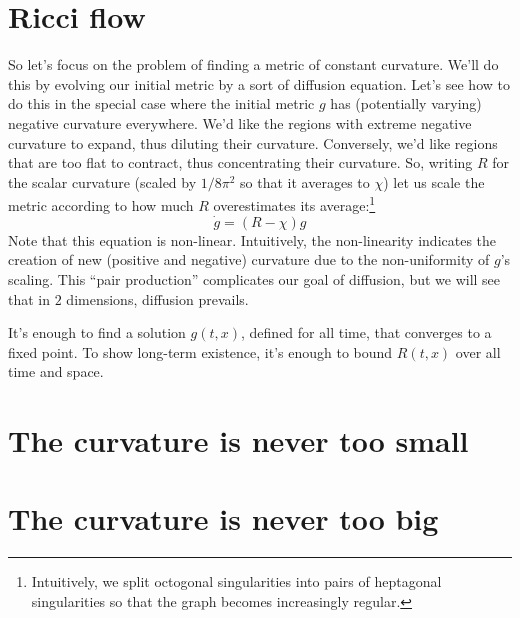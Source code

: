 \documentclass[11pt, justified]{tufte-book}
\theoremstyle{definition}
\newcommand{\msec}[1]{\section{\color{mblu}\textsf{#1}}}
\begin{document}
    \msec{Ricci flow}

        So let's focus on the problem of finding a metric of constant
        curvature.  We'll do this by evolving our initial metric by a sort of
        diffusion equation.
        Let's see how to do this in the special case where
        the initial metric $g$ has (potentially varying) negative
        curvature everywhere.  We'd like the regions with extreme negative
        curvature to expand, thus diluting their curvature.  Conversely, we'd
        like regions that are too flat to contract, thus concentrating their
        curvature.  So, writing $R$ for the scalar curvature (scaled by
        $1/8\pi^2$ so that it averages to $\chi$) let us scale the metric
        according to how much $R$ overestimates its average:\footnote{
            Intuitively, we split octogonal singularities into pairs of
            heptagonal singularities so that the graph becomes increasingly
            regular.
        }
        $$
            \dot{g} = (R - \chi) g
        $$
        Note that this equation is non-linear.  Intuitively, the non-linearity
        indicates the creation of new (positive and negative) curvature due to
        the non-uniformity of $g$'s scaling.  This ``pair production''
        complicates our goal of diffusion, but we will see that in $2$
        dimensions, diffusion prevails.

        It's enough to find a solution $g(t,x)$, defined for all time, that
        converges to a fixed point.  To show long-term existence, it's enough
        to bound $R(t,x)$ over all time and space.



    \msec{The curvature is never too small}
        
    \msec{The curvature is never too big}
        
\end{document}
